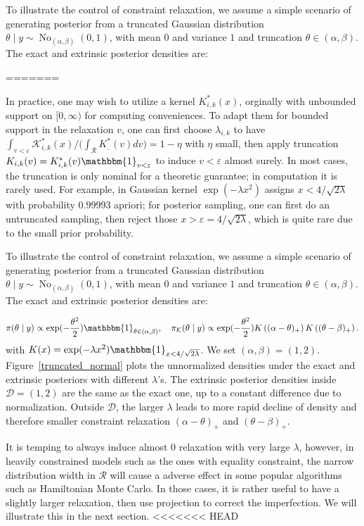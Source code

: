 \documentclass[10pt]{article}
\newcommand{\mc}[1]{\mathcal{#1}}
\DeclareMathOperator{\No}{No}
\DeclareMathOperator{\1}{\mathbbm{1}}
\begin{document}
To illustrate the control of constraint relaxation, we assume a simple scenario of generating posterior from a truncated Gaussian distribution $\theta \mid y \sim \No_{(\alpha,\beta)}(0,1)$, with mean $0$ and variance $1$ and truncation $\theta\in (\alpha,\beta)$. The exact and extrinsic posterior densities are:

=======

In practice, one may wish to utilize a kernel $K^*_{i,k}(x)$, orginally with unbounded support on $[0,\infty)$ for computing conveniences. To adapt them for bounded support in the relaxation $v$, one can first choose $\lambda_{i,k}$ to have $\int_{v<\varepsilon} \mc K^*_{i,k}(x)/ \big( \int_{\mc R} K^*_{.}(v) dv\big ) = 1-\eta$ with $\eta$ small, then apply truncation $K_{i,k}(v)= K^*_{i,k}(v) \mathbbm{1}_{v<\varepsilon}$ to induce $v<\varepsilon$ almost surely. In most cases, the truncation is only nominal for a theoretic guarantee; in computation it is rarely used. For example, in Gaussian kernel $\exp( -{\lambda x^2})$ assigns $x<4/\sqrt{2\lambda}$ with probability $0.99993$ apriori; for posterior sampling, one can first do an untruncated sampling, then reject those $x>\varepsilon=4/\sqrt{2\lambda}$, which is quite rare due to the small prior probability. 

To illustrate the control of constraint relaxation, we assume a simple scenario of generating posterior from a truncated Gaussian distribution $\theta \mid y \sim \No_{(\alpha,\beta)}(0,1)$, with mean $0$ and variance $1$ and truncation $\theta\in (\alpha,\beta)$. The exact and extrinsic posterior densities are:

$$\pi(\theta\mid y)\propto \exp(-\frac{\theta^2}{2}) \mathbbm{1}_{\theta\in(\alpha,\beta)}, \quad \pi_{\mc K}(\theta\mid y)\propto \exp(-\frac{\theta^2}{2}) K \left ( (\alpha - \theta)_+ \right) K \left ( ( \theta - \beta)_+ \right).$$
with $K(x)= \exp( - \lambda x^2)\mathbbm{1}_{x<4/\sqrt{2\lambda}}$. We set $(\alpha, \beta)=(1,2)$. Figure~\ref{truncated_normal} plots the unnormalized densities under the exact and extrinsic posteriors with different $\lambda$'s. The extrinsic posterior densities inside $\mc D = (1,2)$ are the same as the exact one, up to a constant difference due to normalization. Outside $\mc D$, the larger $\lambda$ leads to more rapid decline of density and therefore smaller constraint relaxation $(\alpha - \theta)_+ $ and $ ( \theta - \beta)_+$.


It is temping to always induce almost $0$ relaxation with very large $\lambda$, however, in heavily constrained models such as the ones with equality constraint, the narrow distribution width in $\mc R$ will cause a adverse effect in some popular algorithms such as Hamiltonian Monte Carlo. In those cases, it is rather useful to have a slightly larger relaxation, then use projection to correct the imperfection. We will illustrate this in the next section.
<<<<<<< HEAD
\end{document}
